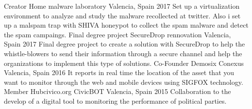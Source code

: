 \begin{cventries}
  \cventry
    {Creator}
    {Home malware laboratory}
    {Valencia, Spain}
    {2017}
    {
      Set up a virtualization environment to analyze and study the malware recollected at twitter. Also i set up a malspam trap with SHIVA honeypot to collect the spam malware and detect the spam campaings.
    }
  \cventry
    {Final degree project}
    {SecureDrop rennovation}
    {Valencia, Spain}
    {2017}
    {
      Final degree project to create a solution with SecureDrop to help the whistle-blowers to send their information through a secure channel and help the organizations to implement this type of solutions.
    }
  \cventry
    {Co-Founder Demosix}
    {Conexus}
    {Valencia, Spain}
    {2016}
    {
      It reports in real time the location of the asset that you want to monitor through the web and mobile devices using SIGFOX technology.
    }
    \cventry
    {Member Hubcivico.org}
    {CivicBOT}
    {Valencia, Spain}
    {2015}
    {
      Collaboration to the develop of a digital tool to monitoring the performance of political parties.
    }
\end{cventries}
